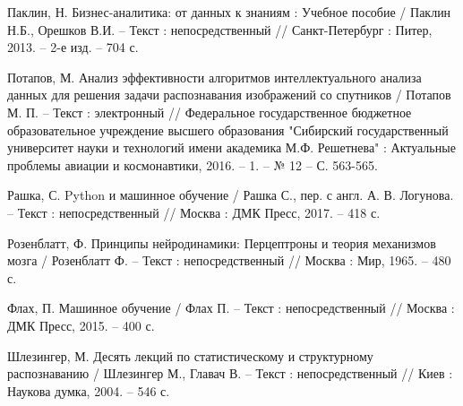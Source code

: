 \begin{thebibliography}{3}
	 Паклин, Н. Бизнес-аналитика: от данных к знаниям : Учебное пособие / Паклин Н.Б., Орешков В.И. -- Текст : непосредственный // Санкт-Петербург : Питер, 2013. -- 2-е изд. -- 704 с.
	
	 Потапов, М. Анализ эффективности алгоритмов интеллектуального анализа данных для решения задачи распознавания изображений со спутников / Потапов М. П. -- Текст : электронный // Федеральное государственное бюджетное образовательное учреждение высшего образования "Сибирский государственный университет науки и технологий имени академика М.Ф. Решетнева" : Актуальные проблемы авиации и космонавтики, 2016. -- 1. -- № 12 -- С. 563-565.	
	
	 Рашка, С. Python и машинное обучение / Рашка С., пер. с англ. А. В. Логунова. -- Текст : непосредственный // Москва : ДМК Пресс, 2017. -- 418 с.		
	
	 Розенблатт, Ф. Принципы нейродинамики: Перцептроны и теория механизмов мозга / Розенблатт Ф. -- Текст : непосредственный // Москва : Мир, 1965. -- 480 с.	
	
	 Флах, П. Машинное обучение / Флах П. -- Текст : непосредственный // Москва : ДМК Пресс, 2015. -- 400 с.
	
	 Шлезингер, М. Десять лекций по статистическому и структурному распознаванию / Шлезингер М., Главач В. -- Текст : непосредственный // Киев : Наукова думка, 2004. -- 546 с.
	
\end{thebibliography}